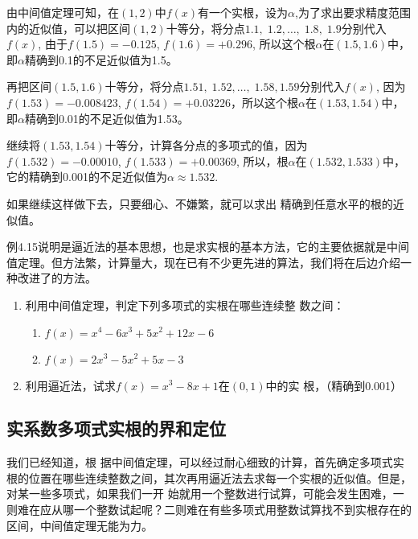 \begin{solution}
    由中间值定理可知，在$(1, 2)$中$f(x)$有一个实根，设为$\alpha$,为了求出要求精度范围内的近似值，可以把区间$(1, 2)$十等分，将分点$1.1,\; 1.2,\ldots,\; 1.8,\; 1.9$分别代入$f(x)$, 由于$f(1. 5)=-0.125$, $f(1. 6)=+0.296$, 所以这个根$\alpha$在$(1.5, 1. 6)$中，即$\alpha$精确到0.1的不足近似值为1.5。
    
    再把区间$(1.5, 1. 6)$十等分，将分点$1.51,\; 1.52,\ldots,\; 1.58, 1.59$分别代入$f(x)$, 因为$f(1.53)=-0.008423$, $f(1.54)=+0.03226$，所以这个根$\alpha$在$(1.53, 1. 54)$中，即$\alpha$精确到0.01的不足近似值为1.53。

    继续将$(1.53, 1.54)$十等分，计算各分点的多项式的值，因为$f(1. 532)=-0. 00010$, $f(1. 533)=+0.00369$, 所以，根$\alpha$在$(1. 532, 1. 533)$中，它的精确到0.001的不足近似值为$\alpha\approx1.532$.

    如果继续这样做下去，只要细心、不嫌繁，就可以求出
    精确到任意水平的根的近似值。
\end{solution}

    例4.15说明是逼近法的基本思想，也是求实根的基本方法，它的主要依据就是中间值定理。但方法繁，计算量大，现在已有不少更先进的算法，我们将在后边介绍一种改进了的方法。

\begin{ex}
\begin{enumerate}
    \item 利用中间值定理，判定下列多项式的实根在哪些连续整
数之间：
\begin{enumerate}
    \item $f (x) =x^4-6x^3+5x^2+12x-6$
    \item $f (x) =2x^3-5x^2+5x-3$
\end{enumerate}
\item 利用逼近法，试求$f(x)=x^3-8x+1$在$(0, 1)$中的实
根，（精确到0.001）
\end{enumerate}
\end{ex}

\subsection{实系数多项式实根的界和定位}

我们已经知道，根
据中间值定理，可以经过耐心细致的计算，首先确定多项式实根的位置在哪些连续整数之间，其次再用逼近法去求每一个实根的近似值。但是，对某一些多项式，如果我们一开
始就用一个整数进行试算，可能会发生困难，一则难在应从哪一个整数试起呢？二则难在有些多项式用整数试算找不到实根存在的区间，中间值定理无能为力。

